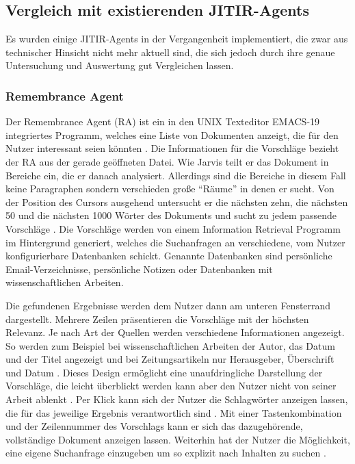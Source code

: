\subsection{Vergleich mit existierenden JITIR-Agents}
Es wurden einige JITIR-Agents in der Vergangenheit implementiert, die zwar aus technischer Hinsicht nicht mehr aktuell sind, die sich jedoch durch ihre genaue Untersuchung und Auswertung gut Vergleichen lassen.

 	\subsubsection{Remembrance Agent}
 	Der Remembrance Agent (RA) ist ein in den UNIX Texteditor EMACS-19 integriertes Programm, welches eine Liste von Dokumenten anzeigt, die für den Nutzer interessant seien könnten \cite{rhodes2000thesis}. Die Informationen für die Vorschläge bezieht der RA aus der gerade geöffneten Datei. Wie Jarvis teilt er das Dokument in Bereiche ein, die er danach analysiert. Allerdings sind die Bereiche in diesem Fall keine Paragraphen sondern verschieden große ``Räume'' in denen er sucht. Von der Position des Cursors ausgehend untersucht er die nächsten zehn, die nächsten 50 und die nächsten 1000 Wörter des Dokuments und sucht zu jedem passende Vorschläge \cite{rhodes1996remembrance}. Die Vorschläge werden von einem Information Retrieval Programm im Hintergrund generiert, welches die Suchanfragen an verschiedene, vom Nutzer konfigurierbare Datenbanken schickt. Genannte Datenbanken sind persönliche Email-Verzeichnisse, persönliche Notizen oder Datenbanken mit wissenschaftlichen Arbeiten.

 	Die gefundenen Ergebnisse werden dem Nutzer dann am unteren Fensterrand dargestellt. Mehrere Zeilen präsentieren die Vorschläge mit der höchsten Relevanz. Je nach Art der Quellen werden verschiedene Informationen angezeigt. So werden zum Beispiel bei wissenschaftlichen Arbeiten der Autor, das Datum und der Titel angezeigt und bei Zeitungsartikeln nur Herausgeber, Überschrift und Datum \cite{rhodes2000just}. Dieses Design ermöglicht eine unaufdringliche Darstellung der Vorschläge, die leicht überblickt werden kann aber den Nutzer nicht von seiner Arbeit ablenkt \cite{rhodes1996remembrance}. Per Klick kann sich der Nutzer die Schlagwörter anzeigen lassen, die für das jeweilige Ergebnis verantwortlich sind \cite{rhodes2000thesis}. Mit einer Tastenkombination und der Zeilennummer des Vorschlags kann er sich das dazugehörende, vollständige Dokument anzeigen lassen. Weiterhin hat der Nutzer die Möglichkeit, eine eigene Suchanfrage einzugeben um so explizit nach Inhalten zu suchen \cite{rhodes1996remembrance}.

